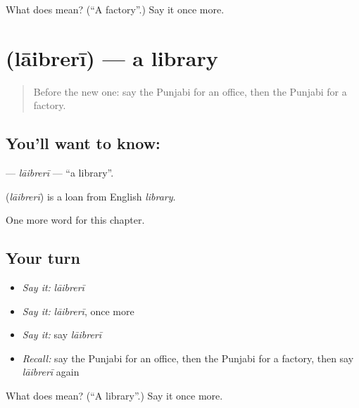 \begin{tcolorbox}[breakable,colback=teal!4,colframe=teal!35!black,title={Before you move on}]
What does  mean? (\textquotedblleft{}A factory\textquotedblright{}.) Say it once more.
\end{tcolorbox}
\section[\texorpdfstring{\pa{ਲਾਇਬ੍ਰੇਰੀ} (lāibrerī)}{ਲਾਇਬ੍ਰੇਰੀ (lāibrerī)}]{ (lāibrerī) — a library}

\label{lesson:PA-C137-laibreri}



\begin{quote}
Before the new one: say the Punjabi for an office, then the Punjabi for a factory.
\end{quote}

\subsection*{You'll want to know: }
\textbf{} — \emph{lāibrerī} — \textquotedblleft{}a library\textquotedblright{}.

\begin{cousinweb}
\textbf{} (\emph{lāibrerī}) is a loan from English \emph{library}.
\end{cousinweb}

\begin{grammarlens}[title={What you've built}]
One more word for this chapter.
\end{grammarlens}

\subsection*{Your turn}
\begin{itemize}
\raggedright
  \item \emph{Say it:} \emph{lāibrerī}
  \item \emph{Say it:} \emph{lāibrerī}, once more
  \item \emph{Say it:} say \emph{lāibrerī}
  \item \emph{Recall:} say the Punjabi for an office, then the Punjabi for a factory, then say \emph{lāibrerī} again
\end{itemize}

\begin{tcolorbox}[breakable,colback=teal!4,colframe=teal!35!black,title={Before you move on}]
What does  mean? (\textquotedblleft{}A library\textquotedblright{}.) Say it once more.
\end{tcolorbox}
